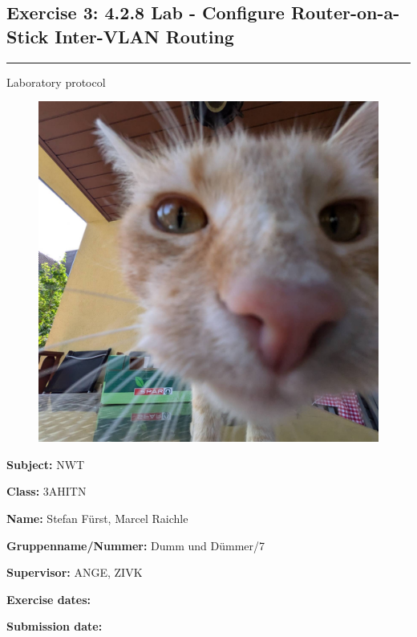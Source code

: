 \documentclass[a4paper]{article}
\newcommand{\abc}{\hfill \break}
\begin{document}

\pagestyle{oida}
\subsection*{Exercise 3: 4.2.8 Lab - Configure Router-on-a-Stick Inter-VLAN Routing}
\par\noindent\rule{\textwidth}{0.4pt}

Laboratory protocol

\begin{figure}[h]
	\includegraphics[scale=0.2]{images/mika.jpeg}
	\centering
\end{figure}

\vspace*{\fill}
\textbf{Subject:}	NWT\abc

\textbf{Class:}	3AHITN\abc

\textbf{Name:}	Stefan Fürst, Marcel Raichle\abc

\textbf{Gruppenname/Nummer:} Dumm und Dümmer/7\abc

\textbf{Supervisor:} 	ANGE, ZIVK\abc

\textbf{Exercise dates:}	\abc

\textbf{Submission date:}\abc

\abc \abc \abc \abc

\newpage
\tableofcontents
\end{document}
